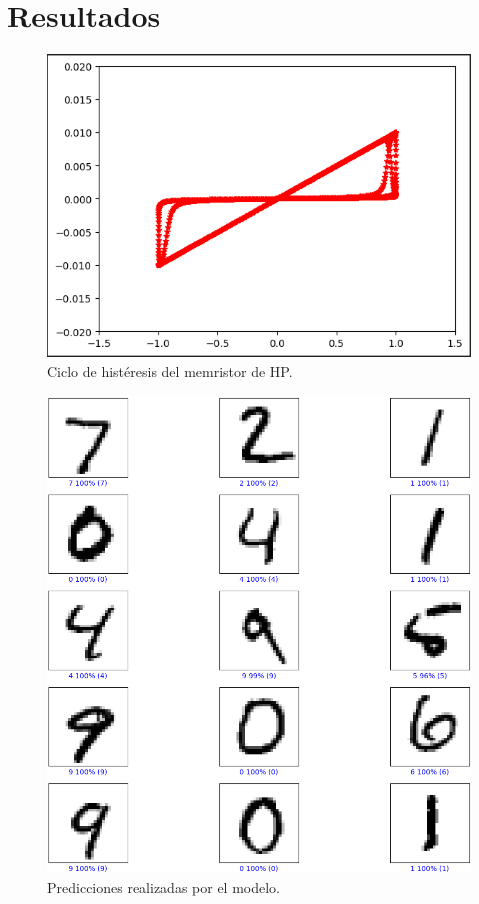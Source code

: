 \documentclass[conference]{IEEEtran}
\begin{document}
\section{Resultados}

\begin{figure}[ht]
	\centering
	\includegraphics[scale=0.55]{img/Histeresis.png}
	\caption{Ciclo de histéresis del memristor de HP.
		\label{fig:histeresis}}
\end{figure}

\begin{figure}[ht]
	\centering
	\includegraphics[scale=0.29]{img/Resultados.png}
	\caption{Predicciones realizadas por el modelo.
		\label{fig:resultados}}
\end{figure}
\end{document}
